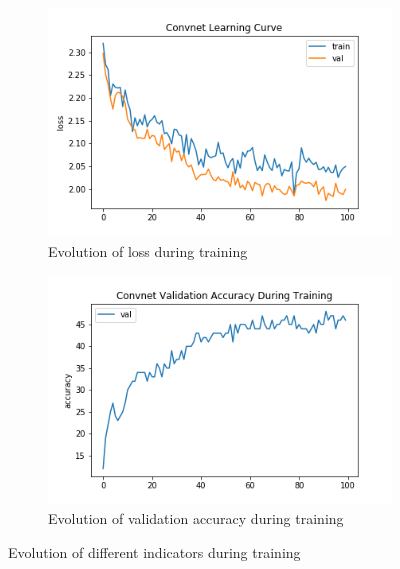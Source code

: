 

\begin{figure}[h!]
  \begin{center}
    \begin{subfigure}[t]{0.49\linewidth}
      \centering
      \includegraphics[width=\linewidth]{../code/assignment/2_pytorch/convnet_lossvstrain.png}
      \caption{Evolution of loss during training}
    \end{subfigure}
    \begin{subfigure}[t]{0.49\linewidth}
      \centering
      \includegraphics[width=\linewidth]{../code/assignment/2_pytorch/convnet_valaccuracy.png}
      \caption{Evolution of validation accuracy during training}
    \end{subfigure}
    \caption{Evolution of different indicators during training}
  \end{center}
\end{figure}

